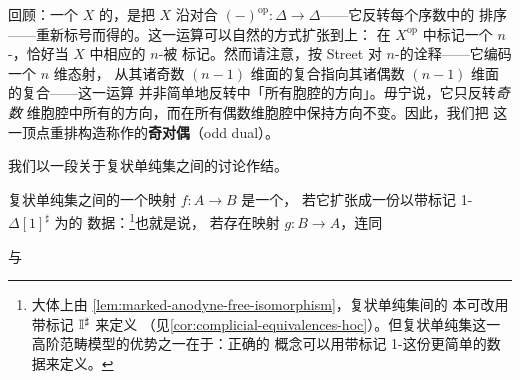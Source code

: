 \begin{remark}[奇对偶]\label{rem:odd-dual}
回顾：一个\trSimplicialSet{} $X$ 的\textbf{\trOppositeSimplicialSet}，是把
$X$ 沿对合 $(-)^{\mathrm{op}}\colon\Delta\to\Delta$——它反转每个序数中的
排序——重新标号而得的\trSimplicialSet{}。这一运算可以自然的方式扩张到\trMarkedSimplicialSet{}上：
在 $X^{\mathrm{op}}$ 中标记一个 $n$-\trSimplex{}，恰好当 $X$ 中相应的 $n$-\trSimplex{}被
标记。然而请注意，按 Street 对 $n$-\trSimplex{}的诠释——它编码一个 $n$ 维态射，
从其诸奇数 $(n-1)$ 维面的复合指向其诸偶数 $(n-1)$ 维面的复合——这一运算
并非简单地反转\trMarkedSimplicialSet{}中「所有胞腔的方向」。毋宁说，它只反转\emph{奇数}
维胞腔中所有\trSimplex{}的方向，而在所有偶数维胞腔中保持方向不变。因此，我们把
这一顶点重排构造称作\trMarkedSimplicialSet{}的\textbf{奇对偶}（odd dual）。
\end{remark}

我们以一段关于复状单纯集之间\trEquivalence{}的讨论作结。

\begin{definition}[复状单纯集的等价]\label{def:complicial-equivalences}
复状单纯集之间的一个映射 $f\colon A\to B$ 是一个\textbf{\trEquivalence}，
若它扩张成一份以带标记 1-\trSimplex{} $\Delta[1]^{\sharp}$ 为\trInterval{}的%
\trHomotopyEquivalence{}数据：\footnote{大体上由
\cref{lem:marked-anodyne-free-isomorphism}，复状单纯集间的\trEquivalence{}%
本可改用带标记\trHomotopyCoherentIsomorphism{} $\mathbb{I}^{\sharp}$ 来定义
（见\cref{cor:complicial-equivalences-hoc}）。但复状单纯集这一高阶范畴模型的优势之一在于：正确的%
\trEquivalence{}概念可以用带标记 1-\trSimplex{}这份更简单的数据来定义。}也就是说，
若存在映射
$g\colon B\to A$，连同
\begin{center}
\qquad 与 \qquad
{}
\end{center}
\end{definition}

